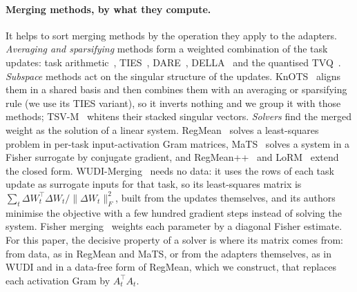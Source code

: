 \paragraph{Merging methods, by what they compute.} It helps to sort merging
methods by the operation they apply to the adapters. \emph{Averaging and
sparsifying} methods form a weighted combination of the task updates: task
arithmetic~\citep{ilharco2023task}, TIES~\citep{yadav2023ties},
DARE~\citep{yu2024dare}, DELLA~\citep{della2024} and the quantised
TVQ~\citep{kim2025tvq}. \emph{Subspace} methods act on the singular structure
of the updates. KnOTS~\citep{stoica2025knots} aligns them in a shared basis
and then combines them with an averaging or sparsifying rule (we use its TIES
variant), so it inverts nothing and we group it with those methods;
TSV-M~\citep{gargiulo2025tsv} whitens their stacked singular vectors.
\emph{Solvers} find the merged weight as the solution of a linear system.
RegMean~\citep{jin2023regmean} solves a least-squares problem in per-task
input-activation Gram matrices, MaTS~\citep{tam2024mats} solves a system in a
Fisher surrogate by conjugate gradient, and RegMean++~\citep{regmeanpp2025}
and LoRM~\citep{lorm2024} extend the closed form.
WUDI-Merging~\citep{cheng2025wudi} needs no data: it uses the rows of each
task update as surrogate inputs for that task, so its least-squares matrix is
$\sum_t \Delta W_t^\top \Delta W_t / \|\Delta W_t\|_F^2$, built from the
updates themselves, and its authors minimise the objective with a few hundred
gradient steps instead of solving the system. Fisher
merging~\citep{matena2022fisher} weights each parameter by a diagonal Fisher
estimate. For this paper, the decisive property of a solver is where its
matrix comes from: from data, as in RegMean and MaTS, or from the adapters
themselves, as in WUDI and in a data-free form of RegMean, which we construct,
that replaces each activation Gram by $A_t^\top A_t$.

